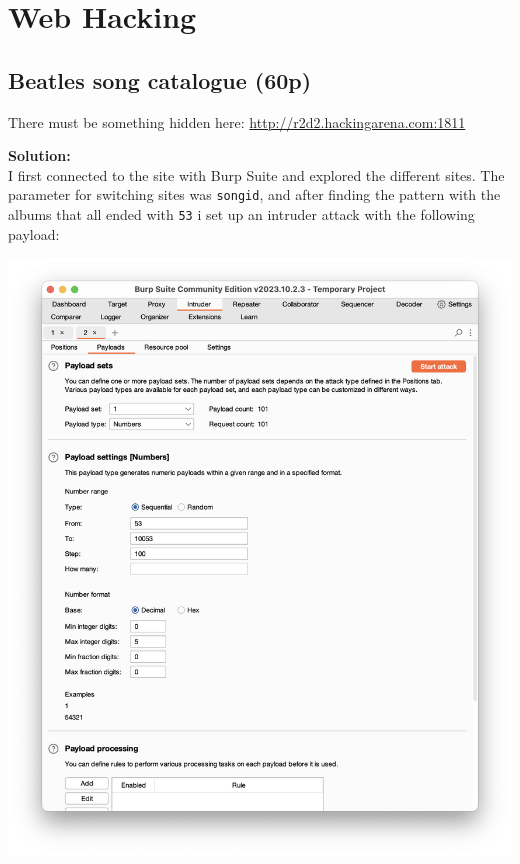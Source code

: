 \section{Web Hacking}

\subsection{Beatles song catalogue (60p)}
There must be something hidden here:
\url{http://r2d2.hackingarena.com:1811}

\textbf{Solution:}\\
I first connected to the site with Burp Suite and explored the different sites. The parameter for switching sites was \texttt{songid}, and after finding the pattern with the albums that all ended with \texttt{53} i set up an intruder attack with the following payload:

\begin{center}
    \includegraphics[width=15cm]{img/Web hacking/Beatles song catalogue/Skjermbilde 2023-10-26 kl. 13.06.47.png}
\end{center}

